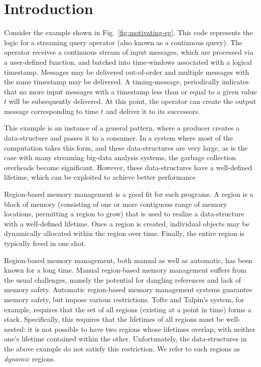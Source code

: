 \newcommand{\TODO}[1]{\textbf{TODO: #1}}
\newcommand{\eg}{\emph{e.g.}}

\section{Introduction}
\label{sec:introduction}

Consider the example shown in Fig.~\ref{fig:motivating-eg}.
This code represents the logic for a streaming query operator (also
known as a continuous query). The operator receives a continuous
stream of input messages, which are processed via a user-defined
function, and batched into time-windows associated with a logical
timestamp. Messages may be delivered out-of-order and multiple
messages with the same timestamp may be delivered. A timing-message,
periodically indicates that no more input messages with a timestamp
less than or equal to a given value $t$ will be subsequently
delivered. At this point, the operator can create the output message
corresponding to time $t$ and deliver it to its successors.



This example is an instance of a general pattern, where a producer
creates a data-structure and passes it to a consumer.  In a system
where most of the computation takes this form, and these
data-structures are very large, as is the case with many streaming
big-data analysis systems, the garbage collection overheads become
significant.
However, these data-structures have a well-defined lifetime, which can
be exploited to achieve better performance 

Region-based memory management is a good fit for such programs.
A region is a block of memory (consisting of one or more contiguous
range of memory locations, permitting a region to grow) that is used to realize
a data-structure with a well-defined lifetime. 
Once a region is created, individual objects may be dynamically allocated within
the region over time. Finally, the entire region is typically freed in one shot.

Region-based memory management, both manual as well as automatic, has been known for
a long time. Manual region-based memory management suffers from the usual challenges,
namely the potential for dangling references and lack of memory safety. Automatic
region-based memory management systems guarantee memory safety, but impose various restrictions.
Tofte and Talpin's system, for example, requires that the set of all regions (existing
at a point in time) forms a stack. Specifically, this requires that the lifetimes of
all regions must be well-nested: it is not possible to have two regions whose lifetimes
overlap, with neither one's lifetime contained within the other.
Unfortunately, the data-structures in the above example do not satisfy this restriction.
We refer to such regions as \emph{dynamic} regions.

